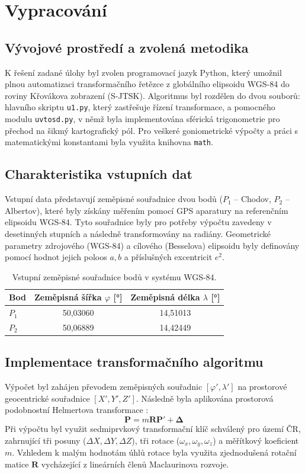 \documentclass[12pt]{article}
\begin{document}
\section{Vypracování}
\subsection{Vývojové prostředí a zvolená metodika}
K řešení zadané úlohy byl zvolen programovací jazyk Python, který umožnil plnou automatizaci transformačního řetězce z globálního elipsoidu WGS-84 do roviny Křovákova zobrazení (S-JTSK). Algoritmus byl rozdělen do dvou souborů: hlavního skriptu \texttt{u1.py}, který zastřešuje řízení transformace, a pomocného modulu \texttt{uvtosd.py}, v němž byla implementována sférická trigonometrie pro přechod na šikmý kartografický pól. Pro veškeré goniometrické výpočty a práci s matematickými konstantami byla využita knihovna \texttt{math}.

\subsection{Charakteristika vstupních dat}
Vstupní data představují zeměpisné souřadnice dvou bodů ($P_1$ – Chodov, $P_2$ – Albertov), které byly získány měřením pomocí GPS aparatury na referenčním elipsoidu WGS-84. Tyto souřadnice byly pro potřeby výpočtu zavedeny v desetinných stupních a následně transformovány na radiány. Geometrické parametry zdrojového (WGS-84) a cílového (Besselova) elipsoidu byly definovány pomocí hodnot jejich poloos $a, b$ a příslušných excentricit $e^2$.

\begin{table}[h!]
\centering
\begin{tabular}{|l|c|c|}
\hline
\textbf{Bod} & \textbf{Zeměpisná šířka $\varphi$ [°]} & \textbf{Zeměpisná délka $\lambda$ [°]} \\ \hline
$P_1$ & 50,03060 & 14,51013 \\ \hline
$P_2$ & 50,06889 & 14,42449 \\ \hline
\end{tabular}
\caption{Vstupní zeměpisné souřadnice bodů v systému WGS-84.}
\end{table}

\subsection{Implementace transformačního algoritmu}
Výpočet byl zahájen převodem zeměpisných souřadnic $[\varphi', \lambda']$ na prostorové geocentrické souřadnice $[X', Y', Z']$. Následně byla aplikována prostorová podobnostní Helmertova transformace :
\[
\mathbf{P} = m\mathbf{R}\mathbf{P}' + \mathbf{\Delta}
\]
Při výpočtu byl využit sedmiprvkový transformační klíč schválený pro území ČR, zahrnující tři posuny ($\Delta X, \Delta Y, \Delta Z$), tři rotace ($\omega_x, \omega_y, \omega_z$) a měřítkový koeficient $m$. Vzhledem k malým hodnotám úhlů rotace byla využita zjednodušená rotační matice $\mathbf{R}$ vycházející z lineárních členů Maclaurinova rozvoje.
\end{document}
